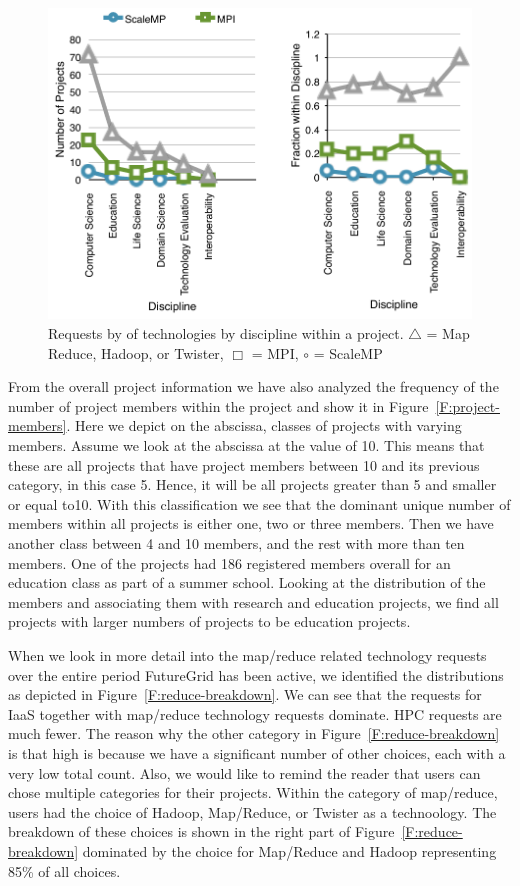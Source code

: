 \documentclass[graybox]{svmult}
\begin{document}
\begin{figure}[p]
 \centering
   \includegraphics[width=.75\textwidth]{images/trend-b.pdf}
 \caption{Requests by of technologies by discipline within a
   project. $\bigtriangleup$ = Map Reduce, Hadoop, or Twister,
   $\Box$  = MPI, $\circ$ = ScaleMP}
  \label{F:trend-b}
\end{figure}

From the overall project information we have also analyzed the frequency of the number of project members within the project and show it in Figure~\ref{F:project-members}. Here we depict on the abscissa, classes of projects with varying members.  Assume we look at the abscissa at the value of 10.  This means that these are all projects that have project members between 10 and its previous category, in this case 5. Hence, it will be all projects greater than 5 and smaller or equal to10. With this classification we see that the dominant unique number of members within all projects is either one, two or three members. Then we have another class between 4 and 10 members, and the rest with more than ten members. One of the projects had 186 registered members overall for an education class as part of a summer school. Looking at the distribution of the members and associating them with research and education projects, we find all projects with larger numbers of projects to be education projects.

When we look in more detail into the map/reduce related technology requests over the entire period FutureGrid has been active, we identified the distributions as depicted in Figure~\ref{F:reduce-breakdown}.  We can see that the requests for IaaS together with map/reduce technology requests dominate. HPC requests are much fewer. The reason why the other category in Figure~\ref{F:reduce-breakdown} is that high is because we have a significant number of other choices, each with a very low total count. Also, we would like to remind the reader that users can chose multiple categories for their projects. Within the category of map/reduce, users had the choice of Hadoop, Map/Reduce, or Twister as a technoology. The breakdown of these choices is shown in the right part of Figure~\ref{F:reduce-breakdown} dominated by the choice for Map/Reduce and Hadoop representing 85\% of all choices.
\end{document}
